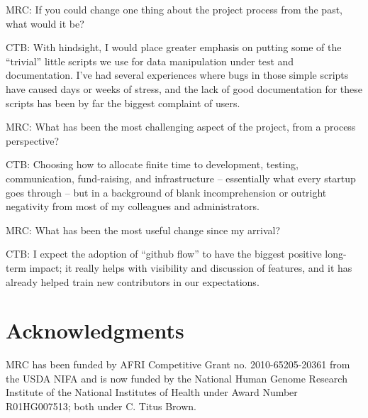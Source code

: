 \documentclass[11pt]{article}
\begin{document}
MRC: If you could change one thing about the project process from the
past, what would it be?

CTB: With hindsight, I would place greater emphasis on putting some of
the ``trivial'' little scripts we use for data manipulation under test
and documentation.  I've had several experiences where bugs in those
simple scripts have caused days or weeks of stress, and the lack of
good documentation for these scripts has been by far the biggest
complaint of users.

MRC: What has been the most challenging aspect of the project, from a
process perspective?

CTB: Choosing how to allocate finite time to development, testing,
communication, fund-raising, and infrastructure -- essentially what
every startup goes through -- but in a background of blank
incomprehension or outright negativity from most of my colleagues
and administrators.

MRC: What has been the most useful change since my arrival?

CTB: I expect the adoption of ``github flow'' \cite{GitHubFlow} to have
the biggest positive long-term impact; it really helps with visibility and
discussion of features, and it has already helped train new contributors in our
expectations.



\section*{Acknowledgments}

MRC has been funded by AFRI Competitive Grant no. 2010-65205-20361
from the USDA NIFA and is now funded by the National Human Genome
Research Institute of the National Institutes of Health under Award
Number R01HG007513; both under C. Titus Brown.








\end{document}
